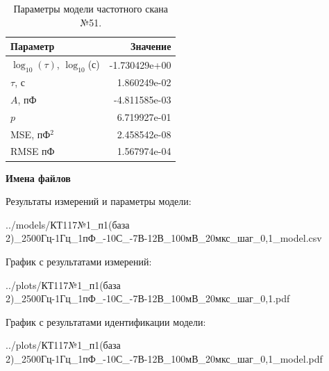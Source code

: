\begin{table}[!ht]
    \centering
    \caption{Параметры модели частотного скана №51.}
    \begin{tabular}{|l|r|}
        \hline
        Параметр                                       & Значение                  \\ \hline
        $\log_{10}(\tau)$, $\log_{10}$(с)              & -1.730429e+00             \\ \hline
        $\tau$, с                                      & 1.860249e-02              \\ \hline
        $A$, пФ                                        & -4.811585e-03             \\ \hline
        $p$                                            & 6.719927e-01              \\ \hline
        MSE, пФ$^2$                                    & 2.458542e-08              \\ \hline
        RMSE пФ                                        & 1.567974e-04              \\ \hline
    \end{tabular}
    \label{table:frequency_scan_model_51}
\end{table}

\textbf{Имена файлов}

Результаты измерений и параметры модели:

\scriptsize../models/КТ117№1\_п1(база 2)\_2500Гц-1Гц\_1пФ\_-10С\_-7В-12В\_100мВ\_20мкс\_шаг\_0,1\_model.csv
\normalsize

График с результатами измерений:

\scriptsize../plots/КТ117№1\_п1(база 2)\_2500Гц-1Гц\_1пФ\_-10С\_-7В-12В\_100мВ\_20мкс\_шаг\_0,1.pdf
\normalsize

График с результатами идентификации модели:

\scriptsize../plots/КТ117№1\_п1(база 2)\_2500Гц-1Гц\_1пФ\_-10С\_-7В-12В\_100мВ\_20мкс\_шаг\_0,1\_model.pdf
\normalsize

